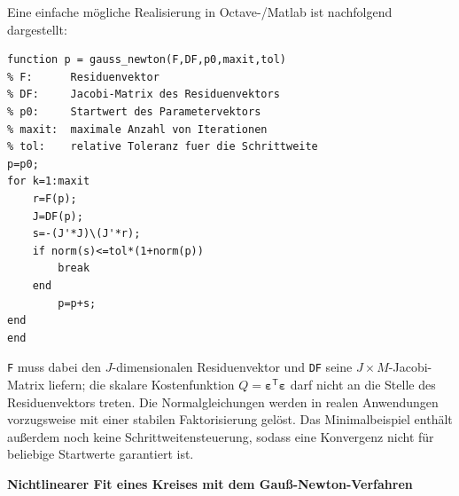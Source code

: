 Eine einfache mögliche Realisierung in Octave-/Matlab ist nachfolgend dargestellt:

\begin{lstlisting}[style=Matlab]
function p = gauss_newton(F,DF,p0,maxit,tol)
% F:      Residuenvektor
% DF:     Jacobi-Matrix des Residuenvektors
% p0:     Startwert des Parametervektors
% maxit:  maximale Anzahl von Iterationen
% tol:    relative Toleranz fuer die Schrittweite
p=p0;
for k=1:maxit
    r=F(p);
    J=DF(p);
    s=-(J'*J)\(J'*r);
    if norm(s)<=tol*(1+norm(p))
        break
    end
        p=p+s;
end
end
\end{lstlisting}
\texttt{F} muss dabei den $J$-dimensionalen Residuenvektor und
\texttt{DF} seine $J\times M$-Jacobi-Matrix liefern; die skalare Kostenfunktion
$Q=\boldsymbol{\varepsilon}^{\mathsf T}\boldsymbol{\varepsilon}$ darf nicht an
die Stelle des Residuenvektors treten. Die Normalgleichungen werden in realen
Anwendungen vorzugsweise mit einer stabilen Faktorisierung gelöst. Das
Minimalbeispiel enthält außerdem noch keine Schrittweitensteuerung, sodass eine
Konvergenz nicht für beliebige Startwerte garantiert ist.

\textbf{Nichtlinearer Fit eines Kreises mit dem Gauß-Newton-Verfahren}

